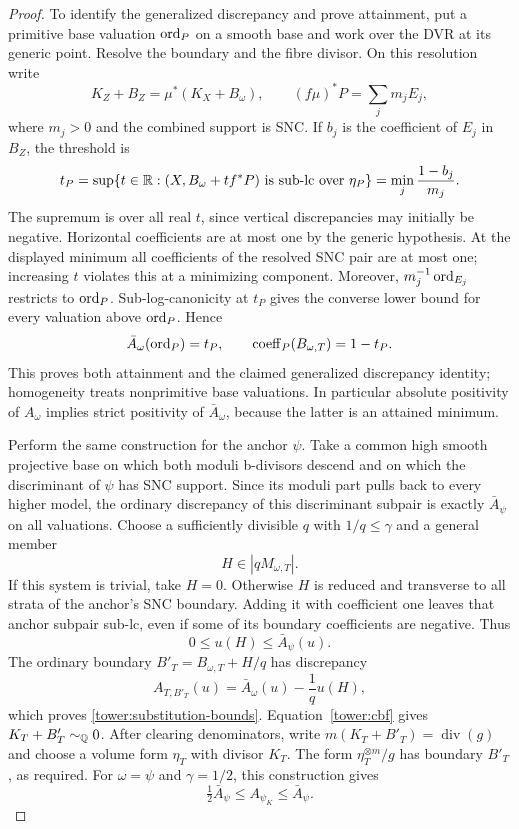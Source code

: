 \begin{proof}
To identify the generalized discrepancy and prove attainment,
put a primitive base valuation $\operatorname{ord}_P$ on a smooth base and work
over the DVR at its generic point.  Resolve the boundary and the
fibre divisor.  On this resolution write
\[
 K_Z+B_Z=\mu^*(K_X+B_\omega),
 \qquad (f\mu)^*P=\sum_j m_jE_j,
\]
where $m_j>0$ and the combined support is SNC.  If $b_j$ is the
coefficient of $E_j$ in $B_Z$, the threshold is
\begin{equation}
\label{tower:dvr-threshold}
 t_P=\sup\{t\in\mathbb R:(X,B_\omega+t f^*P)
       \text{ is sub-lc over }\eta_P\}
     =\min_j\frac{1-b_j}{m_j}.
\end{equation}
The supremum is over all real $t$, since vertical discrepancies
may initially be negative.  Horizontal coefficients are at most
one by the generic hypothesis.  At the displayed minimum all
coefficients of the resolved SNC pair are at most one; increasing
$t$ violates this at a minimizing component.  Moreover,
$m_j^{-1}\operatorname{ord}_{E_j}$ restricts to $\operatorname{ord}_P$.
Sub-log-canonicity at $t_P$ gives the converse lower bound for
every valuation above $\operatorname{ord}_P$.  Hence
\[
 \bar A_\omega(\operatorname{ord}_P)=t_P,
 \qquad \operatorname{coeff}_P(B_{\omega,T})=1-t_P.
\]
This proves both attainment and the claimed generalized
discrepancy identity; homogeneity treats nonprimitive base
valuations.  In particular absolute positivity of $A_\omega$
implies strict positivity of $\bar A_\omega$, because the latter
is an attained minimum.

Perform the same construction for the anchor $\psi$.
Take a common high smooth projective base on which both moduli
b-divisors descend and on which the discriminant of $\psi$ has
SNC support.  Since its moduli part pulls back to every higher
model, the ordinary discrepancy of this discriminant subpair is
exactly $\bar A_\psi$ on all valuations.
Choose a sufficiently divisible $q$ with $1/q\le\gamma$ and a
general member
\[
 H\in|qM_{\omega,T}|.
\]
If this system is trivial, take $H=0$.
Otherwise $H$ is reduced and transverse to all strata of the
anchor's SNC boundary.  Adding it with coefficient one leaves
that anchor subpair sub-lc, even if some of its boundary
coefficients are negative.  Thus
\[
 0\le u(H)\le\bar A_\psi(u).
\]
The ordinary boundary
$B'_T=B_{\omega,T}+H/q$ has discrepancy
\[
 A_{T,B'_T}(u)=\bar A_\omega(u)-\frac1q u(H),
\]
which proves \eqref{tower:substitution-bounds}.
Equation~\eqref{tower:cbf} gives
$K_T+B'_T\sim_{\mathbb Q}0$.  After clearing denominators, write
$m(K_T+B'_T)=\operatorname{div}(g)$ and choose a volume form
$\eta_T$ with divisor $K_T$.  The form
$\eta_T^{\otimes m}/g$ has boundary $B'_T$, as required.
For $\omega=\psi$ and $\gamma=1/2$, this construction gives
\begin{equation}
\label{tower:anchor-substitution}
 \tfrac12\bar A_\psi\le A_{\psi_K}\le\bar A_\psi.
\end{equation}
\end{proof}

